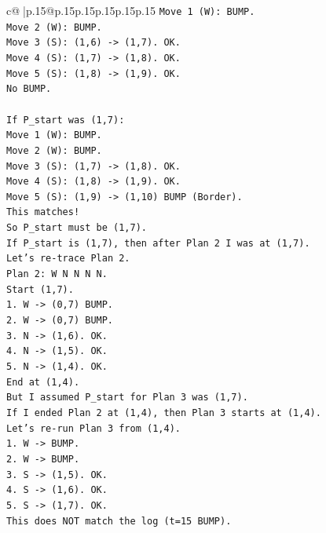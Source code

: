 \documentclass{article}
\begin{document}
{\begin{supertabular}{c@{$\;$}|p{.15\linewidth}@{}p{.15\linewidth}p{.15\linewidth}p{.15\linewidth}p{.15\linewidth}p{.15\linewidth}}
{{{\texttt{Move 1 (W): BUMP.} \\
\texttt{Move 2 (W): BUMP.} \\
\texttt{Move 3 (S): (1,6) {-}> (1,7). OK.} \\
\texttt{Move 4 (S): (1,7) {-}> (1,8). OK.} \\
\texttt{Move 5 (S): (1,8) {-}> (1,9). OK.} \\
\texttt{No BUMP.} \\
\\ 
\texttt{If P\_start was (1,7):} \\
\texttt{Move 1 (W): BUMP.} \\
\texttt{Move 2 (W): BUMP.} \\
\texttt{Move 3 (S): (1,7) {-}> (1,8). OK.} \\
\texttt{Move 4 (S): (1,8) {-}> (1,9). OK.} \\
\texttt{Move 5 (S): (1,9) {-}> (1,10) BUMP (Border).} \\
\texttt{This matches!} \\
\texttt{So P\_start must be (1,7).} \\
\texttt{If P\_start is (1,7), then after Plan 2 I was at (1,7).} \\
\texttt{Let's re{-}trace Plan 2.} \\
\texttt{Plan 2: W N N N N.} \\
\texttt{Start (1,7).} \\
\texttt{1. W {-}> (0,7) BUMP.} \\
\texttt{2. W {-}> (0,7) BUMP.} \\
\texttt{3. N {-}> (1,6). OK.} \\
\texttt{4. N {-}> (1,5). OK.} \\
\texttt{5. N {-}> (1,4). OK.} \\
\texttt{End at (1,4).} \\
\texttt{But I assumed P\_start for Plan 3 was (1,7).} \\
\texttt{If I ended Plan 2 at (1,4), then Plan 3 starts at (1,4).} \\
\texttt{Let's re{-}run Plan 3 from (1,4).} \\
\texttt{1. W {-}> BUMP.} \\
\texttt{2. W {-}> BUMP.} \\
\texttt{3. S {-}> (1,5). OK.} \\
\texttt{4. S {-}> (1,6). OK.} \\
\texttt{5. S {-}> (1,7). OK.} \\
\texttt{This does NOT match the log (t=15 BUMP).} \\
}}}
\end{supertabular}}
\end{document}
